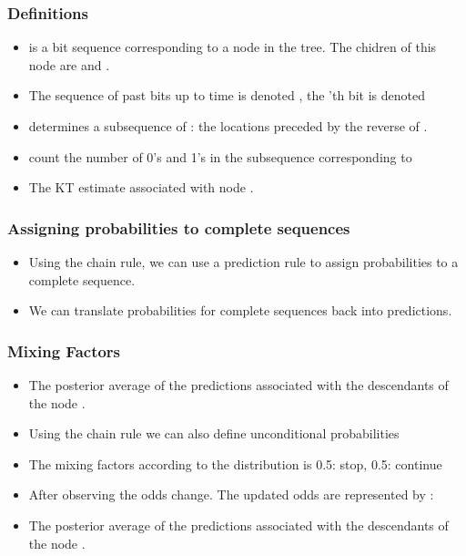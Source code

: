 \documentclass{beamer}
\begin{document}
\begin{frame}
\frametitle{Definitions}
\begin{itemize}
\item {} is a bit sequence corresponding to a node in the
  tree. The chidren of this node are  and .
\item The sequence of past bits up to time  is denoted
  , the 'th bit is denoted 
\item {} determines a subsequence of : the locations
  preceded by the reverse of .
\item {} count the number of 0's
  and 1's in the subsequence corresponding to 
\item     The KT estimate associated with node .
\end{itemize}
\end{frame}

\begin{frame}
\frametitle{Assigning probabilities to complete sequences}
\begin{itemize}
\item Using the chain rule, we can use a prediction rule to 
assign probabilities to a complete sequence.
\R{\[
P \paren{x_1=y_1,\ldots,x_T=y_T} = p \paren{x_1=y_1} p\paren{x_2=y_2|x_1=y_1} \ldots
\]}
\item
We can translate probabilities for complete sequences back into predictions.
\end{itemize}
\end{frame}

\begin{frame}
\frametitle{Mixing Factors}
\begin{itemize}
\item {} The posterior average of
  the predictions associated with the descendants of the node .
\item Using the chain rule we can also define unconditional
  probabilities 
\item The mixing factors according to the  distribution is
  0.5: stop, 0.5: continue
\item After observing  the odds change. The updated
  odds are represented by :
\item {} The posterior average of
  the predictions associated with the descendants of the node .
\end{itemize}
\end{frame}
\end{document}
